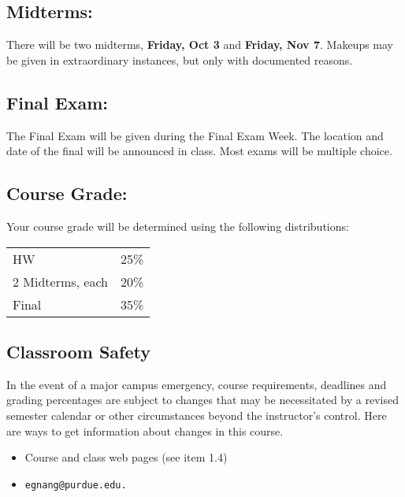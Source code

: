 \documentclass[10pt]{article}
\begin{document}
\subsection{Midterms:}  
	There will be two midterms, {\bf Friday, Oct 3} and {\bf
  Friday, Nov 7}. Makeups may be given in extraordinary
  instances, but only with documented reasons.

\subsection{Final Exam:}
        The Final Exam will be given during the Final Exam Week.
        The location and date of the final will be announced in class.
	Most exams will be multiple choice.

\subsection{Course Grade:}
        Your course grade will be determined using the following 
        distributions:

\begin{tabular}{ll}\\
        HW 		 &    25\%\\
        2 Midterms, each     &  20\%\\
        Final           &     35\%\\
\end{tabular}

\subsection{Classroom Safety}
In the event of a major campus emergency, course requirements,
deadlines and grading percentages are subject to changes that may be
necessitated by a revised semester calendar or other circumstances
beyond the instructor's control. Here are ways to get information
about changes in this course.

\begin{itemize}
\item Course and class web pages (see item 1.4)
\item \tt{egnang@purdue.edu}.
\end{itemize}
\end{document}
